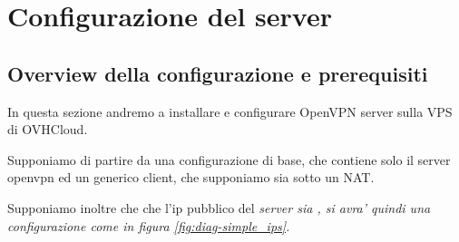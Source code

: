 \chapter{Configurazione del server}
\label{ch:server}


\section{Overview della configurazione e prerequisiti}
\label{sec:overview_server}

In questa sezione andremo a installare e configurare OpenVPN server sulla VPS di OVHCloud.

Supponiamo di partire da una configurazione di base, che contiene solo il server openvpn ed un generico client, che supponiamo sia sotto un NAT.

Supponiamo inoltre che che l'ip pubblico del \it{server} sia , si avra' quindi una configurazione come in figura \ref{fig:diag-simple_ips}.


